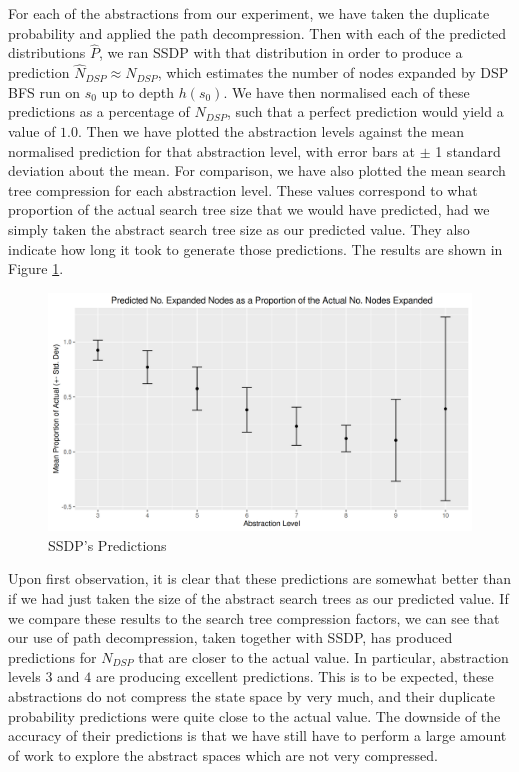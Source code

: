 \documentclass{article}
\begin{document}
For each of the abstractions from our experiment,
we have taken the duplicate probability and applied the path decompression.
Then with each of the predicted distributions \(\hat{P}\),
we ran SSDP with that distribution in order to produce a prediction \(\hat{N}_{DSP} \approx N_{DSP}\),
which estimates the number of nodes expanded by DSP BFS run on \(s_0\) up to depth \(h(s_0)\).
We have then normalised each of these predictions as a percentage of \(N_{DSP}\),
such that a perfect prediction would yield a value of \(1.0\).
Then we have plotted the abstraction levels against the mean normalised prediction
for that abstraction level, with error bars at \(\pm\) 1 standard deviation about the mean.
For comparison, we have also plotted the mean search tree compression for each abstraction level.
These values correspond to what proportion of the actual search tree size that we would have predicted,
had we simply taken the abstract search tree size as our predicted value. They also indicate
how long it took to generate those predictions.
The results are shown in Figure \ref{fig:ssdp}. \\

\begin{figure}
  \centering
  \includegraphics[width=1\textwidth]{predictions_plot}
  \caption{SSDP's Predictions}
  \label{fig:ssdp}
\end{figure}

Upon first observation, it is clear that these predictions are somewhat better than if we had just taken
the size of the abstract search trees as our predicted value. If we compare
these results to the search tree compression factors, we can see that our
use of path decompression, taken together with SSDP, has produced predictions
for \(N_{DSP}\) that are closer to the actual value.
In particular, abstraction levels \(3\) and \(4\) are producing excellent predictions.
This is to be expected, these abstractions do not compress the state space by very much,
and their duplicate probability predictions were quite close to the actual value.
The downside of the accuracy of their predictions is that we have still have to perform
a large amount of work to explore the abstract spaces which are not very compressed. \\
\end{document}
